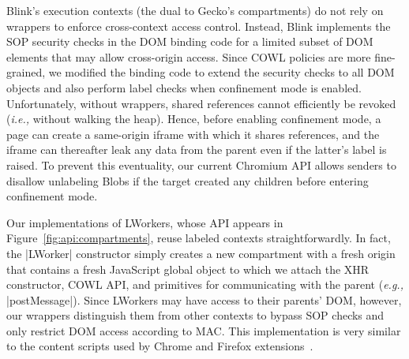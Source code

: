 Blink's execution contexts (the dual to Gecko's compartments) do not
rely on wrappers to enforce cross-context access control.
%
Instead, Blink implements the SOP security checks in the DOM binding
code for a limited subset of DOM elements that may allow cross-origin
access.
%
%
Since COWL policies are more fine-grained, we modified the binding
code to extend the security checks to all DOM objects and also
perform label checks when confinement mode is enabled.
%
Unfortunately, without wrappers, shared references cannot efficiently
be revoked ({\em i.e.,} without walking the heap).
%
Hence, before enabling confinement mode, a page can create a
same-origin iframe with which it shares references, and the iframe can
thereafter leak any data from the parent even if the latter's label is
raised.
%
To prevent this eventuality, our current Chromium API allows senders to disallow
unlabeling Blobs if the target created any children before entering
confinement mode.


Our implementations of LWorkers, whose API appears in
Figure~\ref{fig:api:compartments}, reuse labeled contexts
straightforwardly.
%
In fact, the \js|LWorker| constructor simply creates a new
compartment with a fresh origin that contains a fresh JavaScript
global object to which we attach the XHR constructor, COWL API, and
primitives for communicating with the parent (\emph{e.g.,}
\js|postMessage|).
%
Since LWorkers may have access to their parents' DOM, however, our
wrappers distinguish them from other contexts to bypass SOP checks and
only restrict DOM access according to MAC.
%
This implementation is very similar to the content scripts
used by Chrome and Firefox extensions~\cite{Carlini:2012, addon-sdk}.
 
